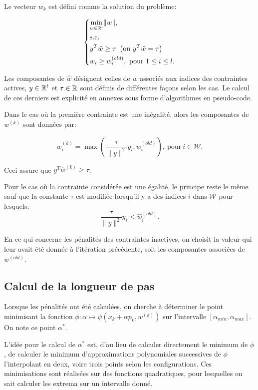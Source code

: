 Le vecteur $w_{k}$ est défini comme la solution du problème: 

\begin{equation}\label{pb poids}
\left\{ \begin{aligned} 
&\underset{w \in \mathbb{R}^{l}}{\min} \|w\|, \\
&\text{s.c.}\\
&y^{T}\hat{w} \geq \tau \ \left(\text{ou } y^{T}\hat{w} = \tau\right)\\
&w_i \geq w_i^{(old)}, \text{ pour } 1 \leq i \leq l.
\end{aligned}\right.
\end{equation}

Les composantes de $\hat{w}$ désignent celles de $w$ associés aux indices des contraintes actives, $y\in\mathbb{R}^t$ et $\tau\in\mathbb{R}$ sont définis de différentes façons selon les cas. 
Le calcul de ces derniers est explicité en annexes sous forme d'algorithmes en pseudo-code.

Dans le cas où la première contrainte est une inégalité, alors les composantes de $w^{(k)}$ sont données par: 

\[w_{i}^{(k)} = \max\left(\dfrac{\tau}{\|y\|^{2}}y_{i}, w_{i}^{(old)}\right),\ \text{pour}\ i\in\mathcal{W}.\]

Ceci assure que $y^{T}\hat{w}^{(k)} \geq \tau$.

Pour le cas où la contrainte considérée est une égalité, le principe reste le même sauf que la constante $\tau$ est modifiée lorsqu'il y a des indices 
$i$ dans $\mathcal{W}$ pour lesquels:
$$\frac{\tau}{\|y\|^{2}}y_{i} < \hat{w}_{i}^{(old)}.$$

En ce qui concerne les pénalités des contraintes inactives, on choisit la valeur qui leur avait été donnée à l'itération précédente, soit les composantes associées de $w^{(old)}$.

\subsection*{Calcul de la longueur de pas}

Lorsque les pénalités ont été calculées, on cherche à déterminer le point minimisant la fonction $\phi: \alpha \mapsto \psi(x_{k}+\alpha p_{k},w^{(k)})$ 
 sur l'intervalle $[\alpha_{min},\alpha_{max}]$. On note ce point $\alpha^*$.

L'idée pour le calcul de $\alpha^*$ est, d'au lieu de calculer directement le minimum de $\phi$, de calculer le minimum d'approximations polynomiales successives de $\phi$ l'interpolant en 
deux, voire trois points selon les configurations. Ces minimisations sont réalisées sur des fonctions quadratiques, pour lesquelles on sait 
calculer les extrema sur un intervalle donné.

